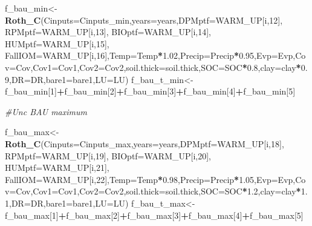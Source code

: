 \documentclass[
  10pt,
  b5paper,
]{book}
\newenvironment{Shaded}{\begin{snugshade}}{\end{snugshade}}
\newcommand{\CommentTok}[1]{\textcolor[rgb]{0.56,0.35,0.01}{\textit{#1}}}
\newcommand{\DataTypeTok}[1]{\textcolor[rgb]{0.13,0.29,0.53}{#1}}
\newcommand{\DecValTok}[1]{\textcolor[rgb]{0.00,0.00,0.81}{#1}}
\newcommand{\FloatTok}[1]{\textcolor[rgb]{0.00,0.00,0.81}{#1}}
\newcommand{\KeywordTok}[1]{\textcolor[rgb]{0.13,0.29,0.53}{\textbf{#1}}}
\newcommand{\NormalTok}[1]{#1}
\newcommand{\OperatorTok}[1]{\textcolor[rgb]{0.81,0.36,0.00}{\textbf{#1}}}
\begin{document}
\begin{Shaded}
\begin{Highlighting}[]
\NormalTok{f_bau_min<-}\KeywordTok{Roth_C}\NormalTok{(}\DataTypeTok{Cinputs=}\NormalTok{Cinputs_min,}\DataTypeTok{years=}\NormalTok{years,}\DataTypeTok{DPMptf=}\NormalTok{WARM_UP[i,}\DecValTok{12}\NormalTok{], }\DataTypeTok{RPMptf=}\NormalTok{WARM_UP[i,}\DecValTok{13}\NormalTok{], }\DataTypeTok{BIOptf=}\NormalTok{WARM_UP[i,}\DecValTok{14}\NormalTok{], }\DataTypeTok{HUMptf=}\NormalTok{WARM_UP[i,}\DecValTok{15}\NormalTok{], }\DataTypeTok{FallIOM=}\NormalTok{WARM_UP[i,}\DecValTok{16}\NormalTok{],}\DataTypeTok{Temp=}\NormalTok{Temp}\OperatorTok{*}\FloatTok{1.02}\NormalTok{,}\DataTypeTok{Precip=}\NormalTok{Precip}\OperatorTok{*}\FloatTok{0.95}\NormalTok{,}\DataTypeTok{Evp=}\NormalTok{Evp,}\DataTypeTok{Cov=}\NormalTok{Cov,}\DataTypeTok{Cov1=}\NormalTok{Cov1,}\DataTypeTok{Cov2=}\NormalTok{Cov2,}\DataTypeTok{soil.thick=}\NormalTok{soil.thick,}\DataTypeTok{SOC=}\NormalTok{SOC}\OperatorTok{*}\FloatTok{0.8}\NormalTok{,}\DataTypeTok{clay=}\NormalTok{clay}\OperatorTok{*}\FloatTok{0.9}\NormalTok{,}\DataTypeTok{DR=}\NormalTok{DR,}\DataTypeTok{bare1=}\NormalTok{bare1,}\DataTypeTok{LU=}\NormalTok{LU)}
\NormalTok{f_bau_t_min<-f_bau_min[}\DecValTok{1}\NormalTok{]}\OperatorTok{+}\NormalTok{f_bau_min[}\DecValTok{2}\NormalTok{]}\OperatorTok{+}\NormalTok{f_bau_min[}\DecValTok{3}\NormalTok{]}\OperatorTok{+}\NormalTok{f_bau_min[}\DecValTok{4}\NormalTok{]}\OperatorTok{+}\NormalTok{f_bau_min[}\DecValTok{5}\NormalTok{]}

\CommentTok{#Unc BAU maximum}

\NormalTok{f_bau_max<-}\KeywordTok{Roth_C}\NormalTok{(}\DataTypeTok{Cinputs=}\NormalTok{Cinputs_max,}\DataTypeTok{years=}\NormalTok{years,}\DataTypeTok{DPMptf=}\NormalTok{WARM_UP[i,}\DecValTok{18}\NormalTok{], }\DataTypeTok{RPMptf=}\NormalTok{WARM_UP[i,}\DecValTok{19}\NormalTok{], }\DataTypeTok{BIOptf=}\NormalTok{WARM_UP[i,}\DecValTok{20}\NormalTok{], }\DataTypeTok{HUMptf=}\NormalTok{WARM_UP[i,}\DecValTok{21}\NormalTok{], }\DataTypeTok{FallIOM=}\NormalTok{WARM_UP[i,}\DecValTok{22}\NormalTok{],}\DataTypeTok{Temp=}\NormalTok{Temp}\OperatorTok{*}\FloatTok{0.98}\NormalTok{,}\DataTypeTok{Precip=}\NormalTok{Precip}\OperatorTok{*}\FloatTok{1.05}\NormalTok{,}\DataTypeTok{Evp=}\NormalTok{Evp,}\DataTypeTok{Cov=}\NormalTok{Cov,}\DataTypeTok{Cov1=}\NormalTok{Cov1,}\DataTypeTok{Cov2=}\NormalTok{Cov2,}\DataTypeTok{soil.thick=}\NormalTok{soil.thick,}\DataTypeTok{SOC=}\NormalTok{SOC}\OperatorTok{*}\FloatTok{1.2}\NormalTok{,}\DataTypeTok{clay=}\NormalTok{clay}\OperatorTok{*}\FloatTok{1.1}\NormalTok{,}\DataTypeTok{DR=}\NormalTok{DR,}\DataTypeTok{bare1=}\NormalTok{bare1,}\DataTypeTok{LU=}\NormalTok{LU)}
\NormalTok{f_bau_t_max<-f_bau_max[}\DecValTok{1}\NormalTok{]}\OperatorTok{+}\NormalTok{f_bau_max[}\DecValTok{2}\NormalTok{]}\OperatorTok{+}\NormalTok{f_bau_max[}\DecValTok{3}\NormalTok{]}\OperatorTok{+}\NormalTok{f_bau_max[}\DecValTok{4}\NormalTok{]}\OperatorTok{+}\NormalTok{f_bau_max[}\DecValTok{5}\NormalTok{]}


\end{Highlighting}
\end{Shaded}
\end{document}
